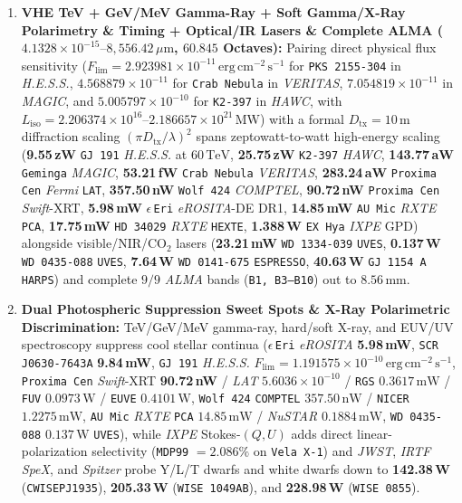 \documentclass[twocolumn,10pt]{article}
\begin{document}
\begin{enumerate}
  \item \textbf{VHE TeV + GeV/MeV Gamma-Ray + Soft Gamma/X-Ray Polarimetry \& Timing + Optical/IR Lasers \& Complete ALMA ($4.1328\times 10^{-15}\text{--}8{,}556.42\,\mu\text{m}$, $60.845$ Octaves):} Pairing direct physical flux sensitivity ($F_{\mathrm{lim}} = 2.923981\times 10^{-11}\,\mathrm{erg\,cm^{-2}\,s^{-1}}$ for \texttt{PKS\,2155-304} in \textit{H.E.S.S.}, $4.568879\times 10^{-11}$ for \texttt{Crab Nebula} in \textit{VERITAS}, $7.054819\times 10^{-11}$ in \textit{MAGIC}, and $5.005797\times 10^{-10}$ for \texttt{K2-397} in \textit{HAWC}, with $L_{\mathrm{iso}} = 2.206374\times 10^{16}\text{--}2.186657\times 10^{21}\,\mathrm{MW}$) with a formal $D_{\mathrm{tx}} = 10\,\text{m}$ diffraction scaling $(\pi D_{\mathrm{tx}}/\lambda)^2$ spans zeptowatt-to-watt high-energy scaling (\textbf{9.55\,zW} \texttt{GJ\,191} \textit{H.E.S.S.} at $60\,\mathrm{TeV}$, \textbf{25.75\,zW} \texttt{K2-397} \textit{HAWC}, \textbf{143.77\,aW} \texttt{Geminga} \textit{MAGIC}, \textbf{53.21\,fW} \texttt{Crab Nebula} \textit{VERITAS}, \textbf{283.24\,aW} \texttt{Proxima Cen} \textit{Fermi} \texttt{LAT}, \textbf{357.50\,nW} \texttt{Wolf\,424} \textit{COMPTEL}, \textbf{90.72\,nW} \texttt{Proxima Cen} \textit{Swift}-XRT, \textbf{5.98\,mW} $\epsilon$\,\texttt{Eri} \textit{eROSITA}-DE DR1, \textbf{14.85\,mW} \texttt{AU\,Mic} \textit{RXTE} \texttt{PCA}, \textbf{17.75\,mW} \texttt{HD\,34029} \textit{RXTE} \texttt{HEXTE}, \textbf{1.388\,W} \texttt{EX\,Hya} \textit{IXPE} GPD) alongside visible/NIR/$\mathrm{CO_2}$ lasers (\textbf{23.21\,mW} \texttt{WD\,1334-039} \texttt{UVES}, \textbf{0.137\,W} \texttt{WD\,0435-088} \texttt{UVES}, \textbf{7.64\,W} \texttt{WD\,0141-675} \texttt{ESPRESSO}, \textbf{40.63\,W} \texttt{GJ\,1154\,A} \texttt{HARPS}) and complete $9/9$ \textit{ALMA} bands (\texttt{B1, B3--B10}) out to $8.56\,\text{mm}$.
  \item \textbf{Dual Photospheric Suppression Sweet Spots \& X-Ray Polarimetric Discrimination:} TeV/GeV/MeV gamma-ray, hard/soft X-ray, and EUV/UV spectroscopy suppress cool stellar continua ($\epsilon$\,\texttt{Eri} \textit{eROSITA} \textbf{5.98\,mW}, \texttt{SCR\,J0630-7643A} \textbf{9.84\,mW}, \texttt{GJ\,191} \textit{H.E.S.S.} $F_{\mathrm{lim}}=1.191575\times 10^{-10}\,\mathrm{erg\,cm^{-2}\,s^{-1}}$, \texttt{Proxima Cen} \textit{Swift}-XRT \textbf{90.72\,nW} / \textit{LAT} $5.6036\times 10^{-10}$ / \texttt{RGS} $0.3617\,\text{mW}$ / \texttt{FUV} $0.0973\,\text{W}$ / \texttt{EUVE} $0.4101\,\text{W}$, \texttt{Wolf\,424} \texttt{COMPTEL} $357.50\,\text{nW}$ / \texttt{NICER} $1.2275\,\text{mW}$, \texttt{AU\,Mic} \textit{RXTE} \texttt{PCA} $14.85\,\text{mW}$ / \textit{NuSTAR} $0.1884\,\text{mW}$, \texttt{WD\,0435-088} $0.137\,\text{W}$ \texttt{UVES}), while \textit{IXPE} Stokes-$(Q,U)$ adds direct linear-polarization selectivity (\texttt{MDP99} $= 2.086\%$ on \texttt{Vela\,X-1}) and \textit{JWST}, \textit{IRTF SpeX}, and \textit{Spitzer} probe Y/L/T dwarfs and white dwarfs down to \textbf{142.38\,W} (\texttt{CWISEPJ1935}), \textbf{205.33\,W} (\texttt{WISE\,1049AB}), and \textbf{228.98\,W} (\texttt{WISE\,0855}).

\end{enumerate}
\end{document}
